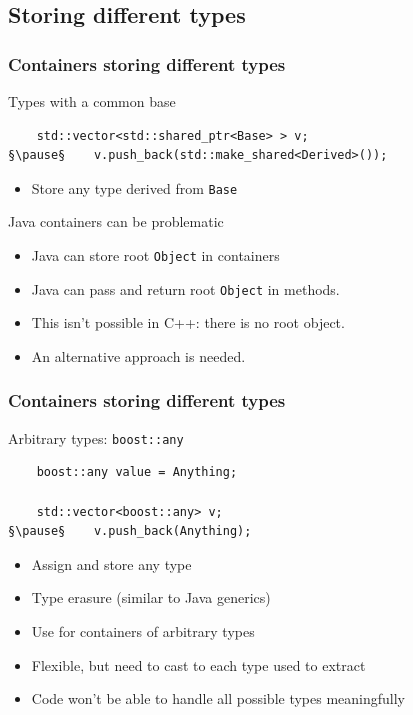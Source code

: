 \documentclass[handout]{beamer}
\begin{document}
\subsection{Storing different types}
\begin{frame}[fragile]
  \frametitle{Containers storing different types}
\begin{block}{Types with a common base}
  \begin{lstlisting}
    std::vector<std::shared_ptr<Base> > v;
§\pause§    v.push_back(std::make_shared<Derived>());
\end{lstlisting}
  \begin{itemize}
    \pause
  \item Store any type derived from \texttt{Base}
  \end{itemize}
\end{block}
\pause
\begin{block}{Java containers can be problematic}
  \begin{itemize}
  \item Java can store root \texttt{Object} in containers
  \item Java can pass and return root \texttt{Object} in methods.
    \pause
  \item This isn't possible in C++: there is no root object.
  \item An alternative approach is needed.
  \end{itemize}
\end{block}
\end{frame}

\begin{frame}[fragile]
  \frametitle{Containers storing different types}
\begin{block}{Arbitrary types: \texttt{boost::any}}
  \begin{lstlisting}
    boost::any value = Anything;

    std::vector<boost::any> v;
§\pause§    v.push_back(Anything);
\end{lstlisting}
  \begin{itemize}
    \pause
  \item Assign and store any type
  \item Type erasure (similar to Java generics)
  \item Use for containers of arbitrary types
    \pause
  \item Flexible, but need to cast to each type used to extract
  \item Code won't be able to handle all possible types meaningfully
  \end{itemize}
\end{block}
\end{frame}
\end{document}
